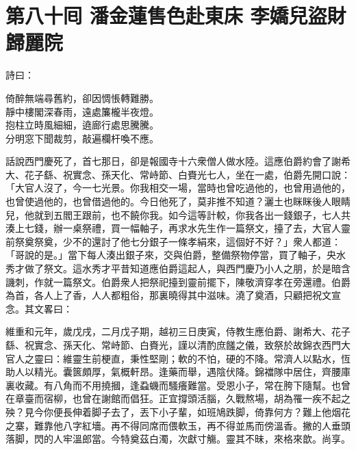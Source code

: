 
\chapter*{第八十囘 潘金蓮售色赴東床 李嬌兒盜財歸麗院}


詩曰：

\begin{myquote} 
倚醉無端尋舊約，卻因惆悵轉難勝。\\靜中樓閣深春雨，遠處簾櫳半夜燈。\\抱柱立時風細細，遶廊行處思騰騰。\\分明窓下聞裁剪，敲遍欄杆喚不應。
\end{myquote} 

話說西門慶死了，首七那日，卻是報國寺十六衆僧人做水陸。這應伯爵約會了謝希大、花子繇、祝實念、孫天化、常峙節、白賚光七人，坐在一處，伯爵先開口說：「大官人沒了，今一七光景。你我相交一場，當時也曾吃過他的，也曾用過他的，也曾使過他的，也曾借過他的。今日他死了，莫非推不知道？{}灑土也眯眯後人眼睛兒，他就到五閻王跟前，也不饒你我。{}如今這等計較，你我各出一錢銀子，七人共湊上七錢，辦一桌祭禮，買一幅軸子，再求水先生作一篇祭文，擡了去，大官人靈前祭奠祭奠，少不的還討了他七分銀子一條孝絹來，這個好不好？」衆人都道：「哥說的是。」當下每人湊出銀子來，交與伯爵，整備祭物停當，買了軸子，央水秀才做了祭文。這水秀才平昔知道應伯爵這起人，與西門慶乃小人之朋，於是暗含譏刺，作就一篇祭文。伯爵衆人把祭祀擡到靈前擺下，陳敬濟穿孝在旁還禮。伯爵為首，各人上了香，人人都粗俗，那裏曉得其中滋味。澆了奠酒，只顧把祝文宣念。其文畧曰：

\begin{myquote}[\markfont]
維重和元年，歲戊戌，二月戊子期，越初三日庚寅，侍教生應伯爵、謝希大、花子繇、祝實念、孫天化、常峙節、白賚光，謹以清酌庶饈之儀，致祭於故錦衣西門大官人之靈曰：維靈生前梗直，秉性堅剛；軟的不怕，硬的不降。常濟人以點水，恆助人以精光。囊篋頗厚，氣概軒昂。逢藥而舉，遇陰伏降。錦襠隊中居住，齊腰庫裏收藏。有八角而不用撓摑，逢蝨蟣而騷癢難當。受恩小子，常在胯下隨幫。也曾在章臺而宿柳，也曾在謝館而倡狂。正宜撐頭活腦，久戰熬場，胡為罹一疾不起之殃？見今你便長伸着脚子去了，丟下小子輩，如班鳩跌脚，倚靠何方？難上他烟花之寨，難靠他八字紅墻。再不得同席而偎軟玉，再不得並馬而傍溫香。撇的人垂頭落脚，閃的人牢溫郎當。今特奠茲白濁，次獻寸觴。靈其不昧，來格來歆。尚享。{}
\end{myquote} 

